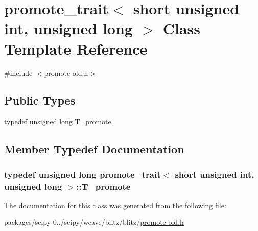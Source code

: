 \hypertarget{classpromote__trait_3_01short_01unsigned_01int_00_01unsigned_01long_01_4}{}\section{promote\+\_\+trait$<$ short unsigned int, unsigned long $>$ Class Template Reference}
\label{classpromote__trait_3_01short_01unsigned_01int_00_01unsigned_01long_01_4}


{\ttfamily \#include $<$promote-\/old.\+h$>$}

\subsection*{Public Types}
\begin{DoxyCompactItemize}
\item 
typedef unsigned long \hyperlink{classpromote__trait_3_01short_01unsigned_01int_00_01unsigned_01long_01_4_a090baf93892518c260da2850698cd50d}{T\+\_\+promote}
\end{DoxyCompactItemize}


\subsection{Member Typedef Documentation}
\hypertarget{classpromote__trait_3_01short_01unsigned_01int_00_01unsigned_01long_01_4_a090baf93892518c260da2850698cd50d}{}
\subsubsection[{T\+\_\+promote}]{\setlength{\rightskip}{0pt plus 5cm}typedef unsigned long {\bf promote\+\_\+trait}$<$ short unsigned int, unsigned long $>$\+::{\bf T\+\_\+promote}}\label{classpromote__trait_3_01short_01unsigned_01int_00_01unsigned_01long_01_4_a090baf93892518c260da2850698cd50d}


The documentation for this class was generated from the following file\+:\begin{DoxyCompactItemize}
\item 
packages/scipy-\/0../scipy/weave/blitz/blitz/\hyperlink{promote-old_8h}{promote-\/old.\+h}\end{DoxyCompactItemize}
